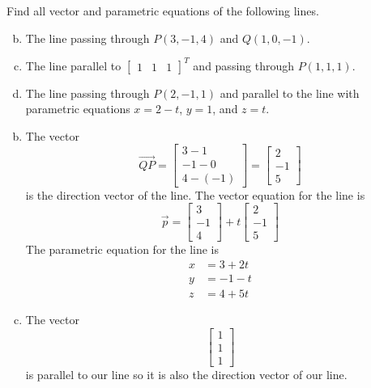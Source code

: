 \documentclass[../main.tex]{subfiles}
\begin{document}
Find all vector and parametric equations of the following lines.
\begin{enumerate}[a)]
	\setcounter{enumi}{1}
	\item The line passing through $P(3, -1, 4)$ and $Q(1, 0, -1)$.
	\setcounter{enumi}{3}
	\item The line parallel to $\begin{bmatrix}1&1&1\end{bmatrix}^T$ and passing through $P(1, 1, 1)$.
	\setcounter{enumi}{5}
	\item The line passing through $P(2, -1, 1)$ and parallel to the line with parametric equations $x = 2 - t$, $y = 1$, and $z = t$.
\end{enumerate}

\solution
\begin{enumerate}[a)]
	\setcounter{enumi}{1}
	\item The vector
	\[ \overrightarrow{QP} = \begin{bmatrix}
					3-1\\
					-1-0\\
					4-(-1)
				 \end{bmatrix}
			       = \begin{bmatrix}
			       		2\\
					-1\\
					5
				 \end{bmatrix} \]
		is the direction vector of the line.
		The vector equation for the line is
		\[ \vec{p} = \begin{bmatrix}
					3\\
					-1\\
					4
			     \end{bmatrix}
			     + t \begin{bmatrix}
			     2\\
			     -1\\
			     5
			     \end{bmatrix} \]
		The parametric equation for the line is
			   \begin{align*}
			   	x &= 3+2t\\
				y &= -1-t\\
				z &= 4+5t
			   \end{align*}
	\setcounter{enumi}{3}
	\item The vector
		\[ \begin{bmatrix}1\\1\\1\end{bmatrix} \]
		is parallel to our line so it is also the direction vector of our line.

\end{enumerate}
\end{document}
